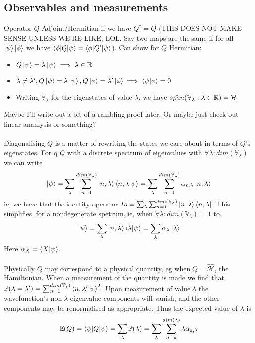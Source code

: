 \documentclass{article}
\begin{document}
\subsection{Observables and measurements}
Operator $Q$ Adjoint/Hermitian if we have $Q^\dagger=Q$ (THIS DOES NOT MAKE SENSE UNLESS WE'RE LIKE, LOL, Say two maps are the same if for all $\ket{\psi}\ket{\phi}$ we have $\braket{\phi |Q|\psi}=\braket{\phi|Q'|\psi}$).  Can show for $Q$ Hermitian:
\begin{itemize}
  \item $Q\ket{\psi}=\lambda\ket{\psi}\implies\lambda\in\mathbb{R}$
  \item $\lambda \neq \lambda',Q\ket{\psi}=\lambda\ket{\psi},Q\ket{\phi}=\lambda'\ket{\phi}\implies \braket{\psi|\phi}=0$
  \item Writing $\mathbb{V}_\lambda$ for the eigenstates of value $\lambda$, we have $\Bar{span}({\mathbb{V}_\lambda:\lambda\in\mathbb{R}})=\mathcal{H}$
\end{itemize}
Maybe I'll write out a bit of a rambling proof later.  Or maybe just check out linear ananlysis or something?
\\
\\
Diagonalising $Q$ is a matter of rewriting the states we care about in terms of $Q$'s eigenstates.  For q $Q$ with a discrete spectrum of eigenvalues with $\forall\lambda: dim(\mathbb{V}_\lambda)$ we can write
$$
  \ket{\psi}=\sum_\lambda\sum_{n=1}^{dim(\mathbb{V}_\lambda)}\ket{n,\lambda}\braket{n,\lambda|\psi}=\sum_\lambda\sum_{n=1}^{dim(\mathbb{V}_\lambda)}\alpha_{n,\lambda}\ket{n,\lambda}
$$
ie,  we have  that the identity operator $Id=\sum_\lambda\sum_{n=1}^{dim(\mathbb{V}_\lambda)}\ket{n,\lambda}\bra{n,\lambda}$.  This simplifies, for a nondegenerate spetrum, ie, when $\forall\lambda:dim(\mathbb{V}_\lambda)=1$ to
$$
  \ket{\psi}=\sum_\lambda\ket{n,\lambda}\braket{\lambda|\psi}=\sum_\lambda\alpha_{\lambda}\ket{\lambda}
$$
Here $\alpha_X=\braket{X|\psi}$.
\\
\\
Physically $Q$ may correspond to a physical quantity, eg when $Q=\hat{\mathcal{H}}$, the Hamiltonian.  When a measurement of the quantity is made we find that $\mathbb{P}(\lambda=\lambda')=\sum_{n=1}^{dim(\mathbb{V}_\lambda')}\braket{n,\lambda'|\psi}^2$.  Upon measurement of value $\lambda$ the wavefunction's non-$\lambda$-eigenvalue components will vanish, and the other components may be renormalised as appropriate.  Thus the expected value of $\lambda$ is
$$
  \mathbb{E}(Q)=\braket{\psi|Q|\psi}=\sum_\lambda\mathbb{P}(\lambda)=\sum_\lambda\sum_{n=a}^{dim(\lambda)}\lambda\alpha_{n,\lambda}
$$
\end{document}
